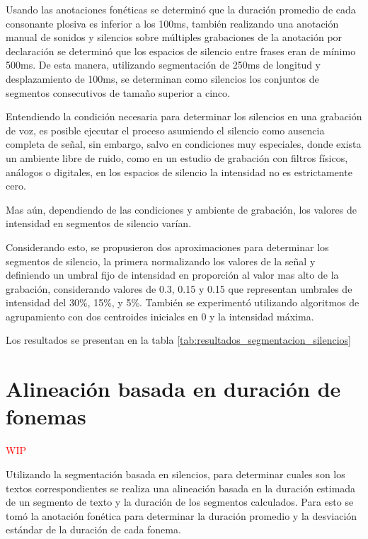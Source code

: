\documentclass[a4paper,12pt,twoside]{report}
\begin{document}
Usando las anotaciones fonéticas se determinó que la duración promedio de cada consonante plosiva es inferior a los 100ms, también realizando una anotación manual de sonidos y silencios sobre múltiples grabaciones de la anotación por declaración se determinó que los espacios de silencio entre frases eran de mínimo 500ms. De esta manera, utilizando segmentación de 250ms de longitud y desplazamiento de 100ms, se determinan como silencios los conjuntos de segmentos consecutivos de tamaño superior a cinco. 

Entendiendo la condición necesaria para determinar los silencios en una grabación de voz, es posible ejecutar el proceso asumiendo el silencio como ausencia completa de señal, sin embargo, salvo en condiciones muy especiales, donde exista un ambiente libre de ruido, como en un estudio de grabación con filtros físicos, análogos o digitales, en los espacios de silencio la intensidad no es estrictamente cero.

Mas aún, dependiendo de las condiciones y ambiente de grabación, los valores de intensidad en segmentos de silencio varían.

Considerando esto, se propusieron dos aproximaciones para determinar los segmentos de silencio, la primera normalizando los valores de la señal y definiendo un umbral fijo de intensidad en proporción al valor mas alto de la grabación, considerando valores de 0.3, 0.15 y 0.15 que representan umbrales de intensidad del 30\%, 15\%, y 5\%. También se experimentó utilizando algoritmos de agrupamiento con dos centroides iniciales en 0 y la intensidad máxima.

Los resultados se presentan en la tabla \ref{tab:resultados_segmentacion_silencios}




\section{Alineación basada en duración de fonemas}

\textcolor{red}{WIP}

Utilizando la segmentación basada en silencios, para determinar cuales son los textos correspondientes se realiza una alineación basada en la duración estimada de un segmento de texto y la duración de los segmentos calculados. Para esto se tomó la anotación fonética para determinar la duración promedio y la desviación estándar de la duración de cada fonema.
\end{document}
